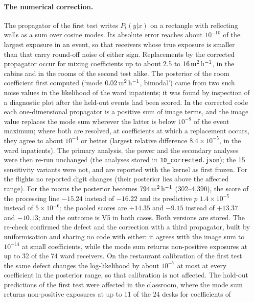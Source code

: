 \paragraph{The numerical correction.}\label{appS_prot2:sec:numerics}
The propagator of the first test writes $P_t(y|x)$ on a rectangle with reflecting walls as a sum over cosine
modes. Its absolute error reaches about $10^{-10}$ of the largest exposure in an event, so that receivers
whose true exposure is smaller than that carry round-off noise of either sign. Replacements by the corrected
propagator occur for mixing coefficients up to about 2.5 to $16\,\mathrm{m}^2\,\mathrm{h}^{-1}$, in the cabins and in the rooms of the
second test alike. The posterior of
the room coefficient first computed (`mode $0.02\,\mathrm{m}^2\,\mathrm{h}^{-1}$, bimodal') came from two such noise values in the
likelihood of the ward inpatients; it was found by inspection of a diagnostic plot after the held-out events
had been scored. In the corrected code each one-dimensional propagator is a positive sum of image terms, and
the image value replaces the mode sum wherever the latter is below $10^{-8}$ of the event maximum; where both
are resolved, at coefficients at which a replacement occurs, they agree to about $10^{-4}$ or better
(largest relative difference $8.4\times10^{-5}$, in the ward inpatients). The primary analysis, the power and the secondary analyses were then
re-run unchanged (the analyses stored in \texttt{10\_corrected.json}); the 15 sensitivity variants were not,
and are reported with the kernel as first frozen. For the flights no reported
digit changes (their posterior lies above the affected range). For the rooms the posterior becomes $794\,\mathrm{m}^2\,\mathrm{h}^{-1}$
(302--4{,}390), the score of the processing line $-15.24$ instead of $-16.22$ and its predictive $p$
$1.4\times10^{-5}$ instead of $5\times10^{-6}$; the pooled scores are $+14.35$ and $-9.15$ instead of $+13.37$
and $-10.13$; and the outcome is V5 in both cases. Both versions are stored. The re-check confirmed
the defect and the correction with a third propagator, built by uniformisation and sharing no code with
either: it agrees with the image sum to $10^{-14}$ at small coefficients, while the mode sum returns
non-positive exposures at up to 32 of the 74 ward receivers. On the restaurant calibration of the first test
the same defect changes the log-likelihood by about $10^{-7}$ at most at every coefficient in the posterior range,
so that calibration is not affected. The hold-out predictions of the first test were affected in the
classroom, where the mode sum returns non-positive exposures at up to 11 of the 24 desks for coefficients of
